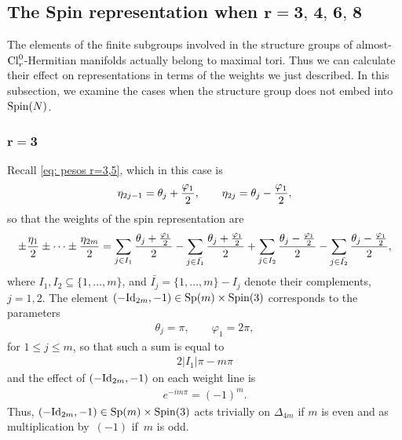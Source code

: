 \documentclass[pdftex]{sigma}
\numberwithin{equation}{section}
\begin{document}
\subsection[The Spin representation when $r=3,4,6,8$]{The Spin representation when $\boldsymbol{r=3,\,4,\,6,\,8}$}\label{subsec: conditions 1}

The elements of the f\/inite subgroups involved in the structure groups of almost-${\rm Cl}_r^0$-Hermitian manifolds actually belong to maximal tori. Thus we can calculate their ef\/fect on representations in terms of the weights we just described. In this subsection, we examine the cases when the structure group does not embed into ${\rm Spin}(N)$.

\subsubsection[$r=3$]{$\boldsymbol{r=3}$}

Recall \eqref{eq: pesos r=3,5}, which in this case is
\begin{gather*}
 \eta_{2j-1} = \theta_j+{\varphi_1\over 2}, \qquad \eta_{2j}= \theta_j-{\varphi_1\over 2} ,
\end{gather*}
so that the weights of the spin representation are
\begin{gather*}
 \pm {\eta_1\over 2} \pm \cdots \pm {\eta_{2m}\over 2} =
 \sum_{j\in I_1} {\theta_j+{\varphi_1\over 2}\over 2} - \sum_{j\in \bar{I_1}} {\theta_j+{\varphi_1\over 2}\over 2}
 + \sum_{j\in I_2} {\theta_j-{\varphi_1\over 2}\over 2} - \sum_{j\in \bar{I_2}} {\theta_j-{\varphi_1\over 2}\over 2},
\end{gather*}
where $I_1,I_2\subseteq \{1,\dots,m\}$, and $\bar{I_j} = \{1,\dots,m\}-I_j$ denote their complements, $j = 1,2$. The element $(-{\rm Id}_{2m},-1)\in {\rm Sp}(m)\times {\rm Spin}(3)$ corresponds to the parameters
\begin{gather*}
 \theta_j = \pi , \qquad \varphi_1 = 2\pi,
\end{gather*}
for $1\leq j\leq m$, so that such a sum is equal to
\begin{gather*}2|I_1|\pi - m\pi\end{gather*}
and the ef\/fect of $(-{\rm Id}_{2m},-1)$ on each weight line is
\begin{gather*}e^{-im\pi} = (-1)^m.
\end{gather*}
Thus, $(-{\rm Id}_{2m},-1)\in {\rm Sp}(m)\times {\rm Spin}(3)$ acts trivially on $\Delta_{4m}$ if $m$ is even and as multiplication by~$(-1)$ if~$m$ is odd.
\end{document}
